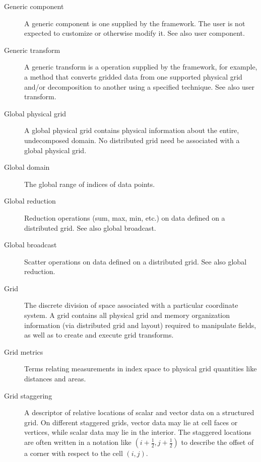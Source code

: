 \begin{description}
\item[Generic component] \label{glos:GenericTrans} A generic component
  is one supplied by the framework.  The user is not expected to 
  customize or otherwise modify it.  See also user component.

\item[Generic transform] \label{glos:GenericTrans} A generic transform 
  is a operation supplied by the framework, for example, a method 
  that converts gridded data from one supported physical grid and/or 
  decomposition to another using a specified technique.  See also user 
  transform.

\item[Global physical grid] \label{glos:GlobPhysGrid} 
  A global physical grid contains physical information about the entire, 
  undecomposed domain.  No distributed grid need be associated with a global 
  physical grid.  

\item[Global domain] \label{glos:GlobDomain}
  The global range of indices of data points.

\item[Global reduction] \label{glos:GlobReduction} 
  Reduction operations (sum, max, min, etc.) on
  data defined on a distributed grid.  See also global broadcast.

\item[Global broadcast] \label{glos:GlobBroadcast}
  Scatter operations on data defined on a distributed grid.
  See also global reduction.

\item[Grid] \label{glos:Grid} The discrete division of space associated with
  a particular coordinate system.  A grid contains all physical grid and memory 
  organization information (via distributed grid and layout) required to manipulate 
  fields, as well as to create and execute grid transforms. 

\item[Grid metrics] \label{glos:GridMetrics} Terms relating measurements 
  in index space to physical grid quantities like distances and areas.

\item[Grid staggering] \label{glos:GridStagger} 
  A descriptor of relative locations
  of scalar and vector data on a structured grid. On different
  staggered grids, vector data may lie at cell faces or vertices,
  while scalar data may lie in the interior. The staggered locations
  are often written in a notation like $(i+\frac12,j+\frac12)$ to
  describe the offset of a corner with respect to the cell $(i,j)$.


\end{description}
